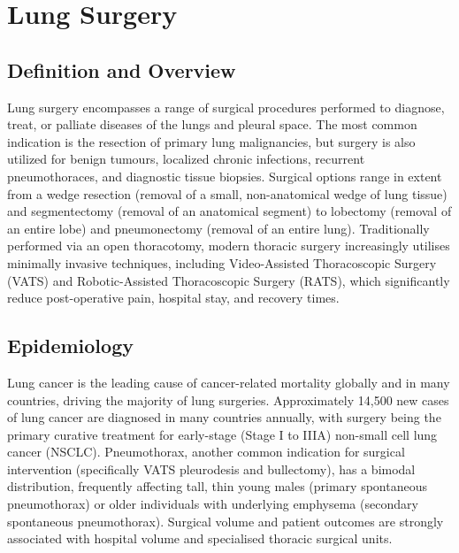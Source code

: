\chapter{Lung Surgery}

\section*{Definition and Overview}
Lung surgery encompasses a range of surgical procedures performed to diagnose, treat, or palliate diseases of the lungs and pleural space. The most common indication is the resection of primary lung malignancies, but surgery is also utilized for benign tumours, localized chronic infections, recurrent pneumothoraces, and diagnostic tissue biopsies. Surgical options range in extent from a wedge resection (removal of a small, non-anatomical wedge of lung tissue) and segmentectomy (removal of an anatomical segment) to lobectomy (removal of an entire lobe) and pneumonectomy (removal of an entire lung). Traditionally performed via an open thoracotomy, modern thoracic surgery increasingly utilises minimally invasive techniques, including Video-Assisted Thoracoscopic Surgery (VATS) and Robotic-Assisted Thoracoscopic Surgery (RATS), which significantly reduce post-operative pain, hospital stay, and recovery times.

\section*{Epidemiology}
Lung cancer is the leading cause of cancer-related mortality globally and in many countries, driving the majority of lung surgeries. Approximately 14,500 new cases of lung cancer are diagnosed in many countries annually, with surgery being the primary curative treatment for early-stage (Stage I to IIIA) non-small cell lung cancer (NSCLC). Pneumothorax, another common indication for surgical intervention (specifically VATS pleurodesis and bullectomy), has a bimodal distribution, frequently affecting tall, thin young males (primary spontaneous pneumothorax) or older individuals with underlying emphysema (secondary spontaneous pneumothorax). Surgical volume and patient outcomes are strongly associated with hospital volume and specialised thoracic surgical units.

